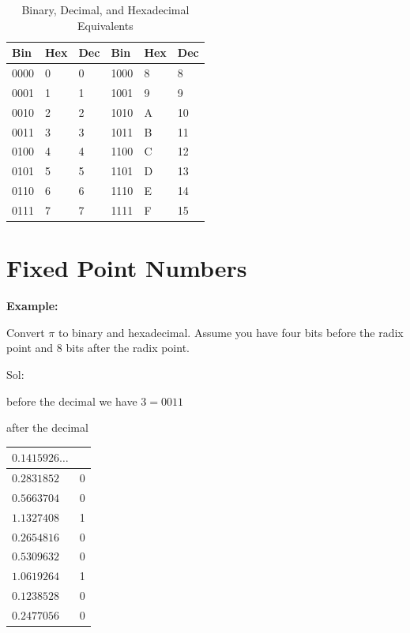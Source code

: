 \begin{table}
  \centering
  \caption{Binary, Decimal, and Hexadecimal Equivalents}\label{t-bindechex}

\begin{tabular}{|lll|lll|} \hline
Bin  & Hex & Dec & Bin & Hex & Dec \\ \hline
0000 & 0    & 0    & 1000 & 8    & 8    \\
0001 & 1    & 1    & 1001 & 9    & 9    \\
0010 & 2    & 2    & 1010 & A    & 10   \\
0011 & 3    & 3    & 1011 & B    & 11   \\ \hline
0100 & 4    & 4    & 1100 & C    & 12   \\
0101 & 5    & 5    & 1101 & D    & 13   \\
0110 & 6    & 6    & 1110 & E    & 14   \\
0111 & 7    & 7    & 1111 & F    & 15   \\ \hline
\end{tabular}

\end{table}

\section{Fixed Point Numbers}


\vspace{.1in}\noindent
\textbf{Example:}


Convert $\pi$ to binary and hexadecimal.  Assume you have four
bits before the radix point and 8 bits after the radix point.

Sol:

before the decimal we have $3=0011$

after the decimal

\begin{tabular}{l|l}
$0.1415926\ldots$ & \\
\hline
$0.2831852$ & 0 \\
$0.5663704$ & 0 \\
$1.1327408$ & 1 \\
$0.2654816$ & 0 \\
$0.5309632$ & 0 \\
$1.0619264$ & 1 \\
$0.1238528$ & 0 \\
$0.2477056$ & 0 \\
\end{tabular}

